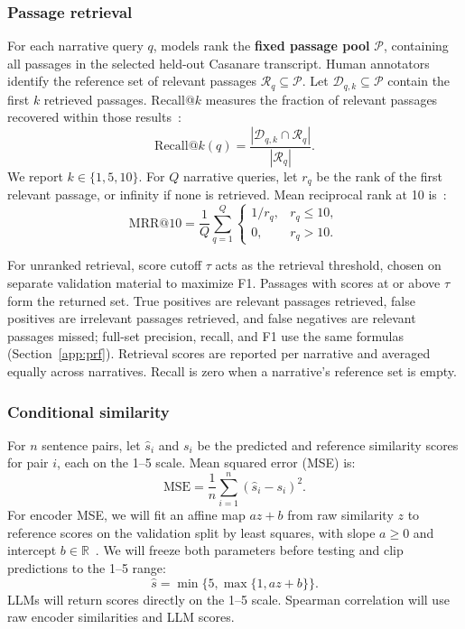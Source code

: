 \documentclass{article}
\begin{document}
\subsubsection{Passage retrieval}
\label{app:retrieval}
For each narrative query \(q\), models rank the \textbf{fixed passage pool} \(\mathcal{P}\), containing all passages in the selected held-out Casanare transcript. Human annotators identify the reference set of relevant passages \(\mathcal{R}_q \subseteq \mathcal{P}\). Let \(\mathcal{D}_{q,k} \subseteq \mathcal{P}\) contain the first \(k\) retrieved passages. Recall@\(k\) measures the fraction of relevant passages recovered within those results~\cite{IRMeasures}:
\[
\mathrm{Recall}@k(q) =
\frac{|\mathcal{D}_{q,k}\cap\mathcal{R}_q|}{|\mathcal{R}_q|}.
\]
We report \(k\in\{1,5,10\}\). For \(Q\) narrative queries, let \(r_q\) be the rank of the first relevant passage, or infinity if none is retrieved. Mean reciprocal rank at 10 is~\cite{IRMeasures}:
\[
\mathrm{MRR}@10 =
\frac{1}{Q}\sum_{q=1}^{Q}
\begin{cases}
1/r_q, & r_q\leq 10,\\
0, & r_q>10.
\end{cases}
\]

For unranked retrieval, score cutoff \(\tau\) acts as the retrieval threshold, chosen on separate validation material to maximize F1. Passages with scores at or above \(\tau\) form the returned set. True positives are relevant passages retrieved, false positives are irrelevant passages retrieved, and false negatives are relevant passages missed; full-set precision, recall, and F1 use the same formulas (Section~\ref{app:prf}). Retrieval scores are reported per narrative and averaged equally across narratives. Recall is zero when a narrative's reference set is empty.

\subsubsection{Conditional similarity}
\label{app:similarity}
For \(n\) sentence pairs, let \(\hat{s}_i\) and \(s_i\) be the predicted and reference similarity scores for pair \(i\), each on the 1--5 scale. Mean squared error (MSE) is:
\[
\mathrm{MSE} = \frac{1}{n}\sum_{i=1}^{n}(\hat{s}_i-s_i)^2.
\]
For encoder MSE, we will fit an affine map \(az+b\) from raw similarity \(z\) to reference scores on the validation split by least squares, with slope \(a\geq 0\) and intercept \(b\in\mathbb{R}\)~\cite{LinearCalibration}. We will freeze both parameters before testing and clip predictions to the 1--5 range:
\[
\hat{s} = \min\{5,\max\{1,az+b\}\}.
\]
LLMs will return scores directly on the 1--5 scale. Spearman correlation will use raw encoder similarities and LLM scores.
\end{document}
